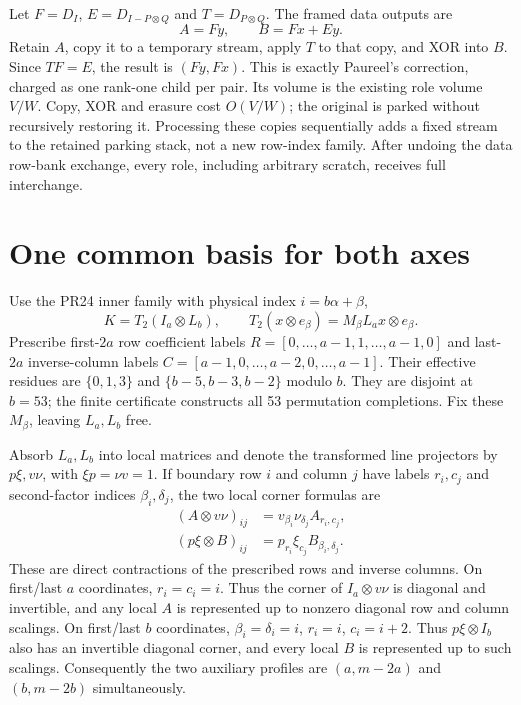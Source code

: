 \documentclass[11pt]{article}
\begin{document}
Let $F=D_I$, $E=D_{I-P\otimes Q}$ and $T=D_{P\otimes Q}$. The framed
data outputs are
\[
 A=Fy,\qquad B=Fx+Ey.
\]
Retain $A$, copy it to a temporary stream, apply $T$ to that copy, and
XOR into $B$. Since $TF=E$, the result is $(Fy,Fx)$. This is exactly
Paureel's correction, charged as one rank-one child per pair. Its volume
is the existing role volume $V/W$. Copy, XOR and erasure cost $O(V/W)$;
the original is parked without recursively restoring it. Processing these
copies sequentially adds a fixed stream to the retained parking stack,
not a new row-index family. After undoing the data row-bank exchange,
every role, including arbitrary scratch, receives full interchange.

\section{One common basis for both axes}
Use the PR24 inner family with physical index $i=b\alpha+\beta$,
\[
 K=T_2(I_a\otimes L_b),\qquad
 T_2(x\otimes e_\beta)=M_\beta L_a x\otimes e_\beta.
\]
Prescribe first-$2a$ row coefficient labels
$R=[0,\ldots,a-1,1,\ldots,a-1,0]$ and last-$2a$ inverse-column labels
$C=[a-1,0,\ldots,a-2,0,\ldots,a-1]$.
Their effective residues are $\{0,1,3\}$ and
$\{b-5,b-3,b-2\}$ modulo $b$. They are disjoint at $b=53$;
the finite certificate constructs all 53 permutation completions.
Fix these $M_\beta$, leaving $L_a,L_b$ free.

Absorb $L_a,L_b$ into local matrices and denote the transformed line
projectors by $p\xi,v\nu$, with $\xi p=\nu v=1$. If boundary row $i$
and column $j$ have labels $r_i,c_j$ and second-factor indices
$\beta_i,\delta_j$, the two local corner formulas are
\[
\begin{aligned}
 (A\otimes v\nu)_{ij}&=v_{\beta_i}\nu_{\delta_j}A_{r_i,c_j},\\
 (p\xi\otimes B)_{ij}&=p_{r_i}\xi_{c_j}B_{\beta_i,\delta_j}.
\end{aligned}
\]
These are direct contractions of the prescribed rows and inverse columns.
On first/last $a$ coordinates, $r_i=c_i=i$. Thus the corner of
$I_a\otimes v\nu$ is diagonal and invertible, and any local $A$ is
represented up to nonzero diagonal row and column scalings. On first/last
$b$ coordinates, $\beta_i=\delta_i=i$, $r_i=i$, $c_i=i+2$.
Thus $p\xi\otimes I_b$ also has an invertible diagonal corner, and every
local $B$ is represented up to such scalings. Consequently the two
auxiliary profiles are $(a,m-2a)$ and $(b,m-2b)$ simultaneously.
\end{document}
